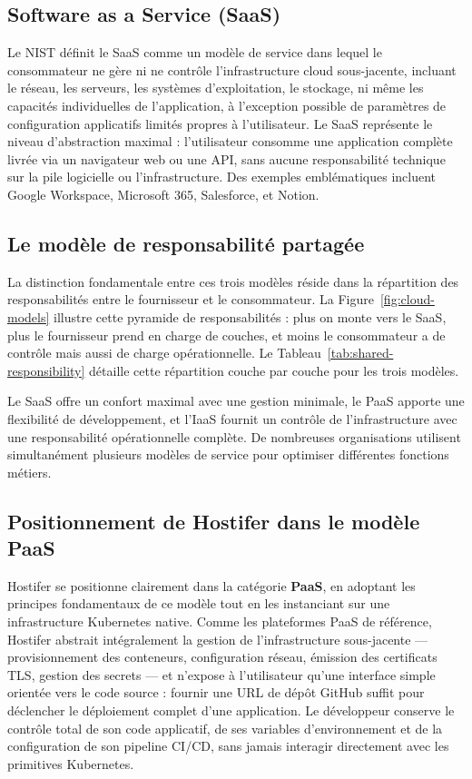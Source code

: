 \subsection*{Software as a Service (SaaS)}

Le NIST définit le SaaS comme un modèle de service dans lequel le consommateur ne gère ni ne contrôle l'infrastructure cloud sous-jacente, incluant le réseau, les serveurs, les systèmes d'exploitation, le stockage, ni même les capacités individuelles de l'application, à l'exception possible de paramètres de configuration applicatifs limités propres à l'utilisateur.  Le SaaS représente le niveau d'abstraction maximal : l'utilisateur consomme une application complète livrée via un navigateur web ou une API, sans aucune responsabilité technique sur la pile logicielle ou l'infrastructure. Des exemples emblématiques incluent Google Workspace, Microsoft 365, Salesforce, et Notion.

\subsection*{Le modèle de responsabilité partagée}

La distinction fondamentale entre ces trois modèles réside dans la répartition des responsabilités entre le fournisseur et le consommateur. La Figure~\ref{fig:cloud-models} illustre cette pyramide de responsabilités : plus on monte vers le SaaS, plus le fournisseur prend en charge de couches, et moins le consommateur a de contrôle mais aussi de charge opérationnelle. Le Tableau~\ref{tab:shared-responsibility} détaille cette répartition couche par couche pour les trois modèles.

Le SaaS offre un confort maximal avec une gestion minimale, le PaaS apporte une flexibilité de développement, et l'IaaS fournit un contrôle de l'infrastructure avec une responsabilité opérationnelle complète. De nombreuses organisations utilisent simultanément plusieurs modèles de service pour optimiser différentes fonctions métiers. 

\subsection*{Positionnement de Hostifer dans le modèle PaaS}

Hostifer se positionne clairement dans la catégorie \textbf{PaaS}, en adoptant les principes fondamentaux de ce modèle tout en les instanciant sur une infrastructure Kubernetes native. Comme les plateformes PaaS de référence, Hostifer abstrait intégralement la gestion de l'infrastructure sous-jacente — provisionnement des conteneurs, configuration réseau, émission des certificats TLS, gestion des secrets — et n'expose à l'utilisateur qu'une interface simple orientée vers le code source : fournir une URL de dépôt GitHub suffit pour déclencher le déploiement complet d'une application. Le développeur conserve le contrôle total de son code applicatif, de ses variables d'environnement et de la configuration de son pipeline CI/CD, sans jamais interagir directement avec les primitives Kubernetes.

